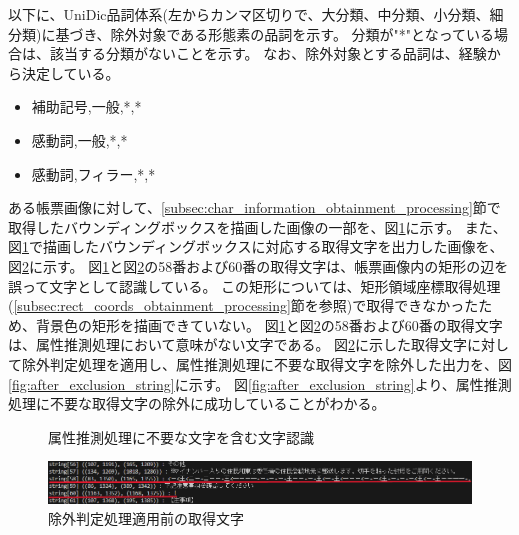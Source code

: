 以下に、UniDic品詞体系(左からカンマ区切りで、大分類、中分類、小分類、細分類)に基づき、除外対象である形態素の品詞を示す。
分類が"*"となっている場合は、該当する分類がないことを示す。
なお、除外対象とする品詞は、経験から決定している。

\begin{itemize}
    \item 補助記号,一般,*,*
    \item 感動詞,一般,*,*
    \item 感動詞,フィラー,*,*
\end{itemize}

ある帳票画像に対して、\ref{subsec:char_information_obtainment_processing}節で取得したバウンディングボックスを描画した画像の一部を、図\ref{fig:before_exclusion_bbox}に示す。
また、図\ref{fig:before_exclusion_bbox}で描画したバウンディングボックスに対応する取得文字を出力した画像を、図\ref{fig:before_exclusion_string}に示す。
図\ref{fig:before_exclusion_bbox}と図\ref{fig:before_exclusion_string}の58番および60番の取得文字は、帳票画像内の矩形の辺を誤って文字として認識している。
この矩形については、矩形領域座標取得処理(\ref{subsec:rect_coords_obtainment_processing}節を参照)で取得できなかったため、背景色の矩形を描画できていない。
図\ref{fig:before_exclusion_bbox}と図\ref{fig:before_exclusion_string}の58番および60番の取得文字は、属性推測処理において意味がない文字である。
図\ref{fig:before_exclusion_string}に示した取得文字に対して除外判定処理を適用し、属性推測処理に不要な取得文字を除外した出力を、図\ref{fig:after_exclusion_string}に示す。
図\ref{fig:after_exclusion_string}より、属性推測処理に不要な取得文字の除外に成功していることがわかる。

\begin{figure}[t]
    \begin{center}
        \caption{属性推測処理に不要な文字を含む文字認識}
        \label{fig:before_exclusion_bbox}
    \end{center}
\end{figure}

\begin{figure}[t]
    \begin{center}
        \includegraphics[width=15cm]{image/04-implementation/before_exclusion_string.png}
        \caption{除外判定処理適用前の取得文字}
        \label{fig:before_exclusion_string}
    \end{center}
\end{figure}

